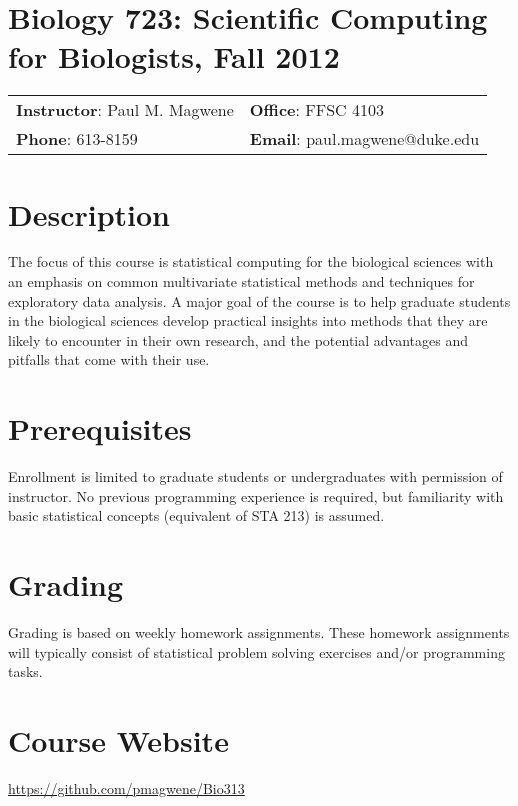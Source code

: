 \documentclass[11pt,letterpaper]{article}
\begin{document}
\section*{\centering Biology 723: Scientific Computing for Biologists, Fall 2012}
\begin{center}
\begin{tabular}{ll}
\textbf{Instructor}: Paul M. Magwene & \textbf{Office}: FFSC 4103\\
\textbf{Phone}: 613-8159 & \textbf{Email}: paul.magwene@duke.edu
\end{tabular}
\end{center}

\section*{Description}

The focus of this course is statistical computing for the biological sciences with an emphasis on common multivariate statistical methods and techniques for exploratory data analysis. A major goal of the course is to help graduate students in the biological sciences develop practical insights into methods that they are likely to encounter in their own research, and the potential advantages and pitfalls that come with their use.

\section*{Prerequisites}

Enrollment is limited to graduate students or undergraduates with permission of instructor. No previous programming experience is required, but familiarity with basic statistical concepts (equivalent of STA 213) is assumed.

\section*{Grading}
Grading is based on weekly homework assignments. These homework assignments will typically consist of statistical problem solving exercises and/or programming tasks.

\section*{Course Website}

\href{https://github.com/pmagwene/Bio313}{https://github.com/pmagwene/Bio313}
\end{document}
